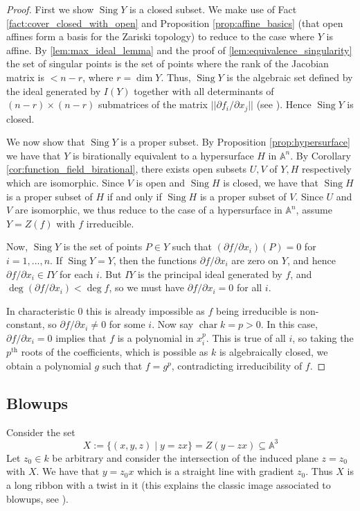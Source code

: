 \documentclass[12pt]{article}
\theoremstyle{plain}
\theoremstyle{definition}
\newcommand{\bb}[1]{\mathbb{#1}}
\begin{document}
\begin{proof}
First we show $\operatorname{Sing}Y$ is a closed subset.  We make use of Fact \ref{fact:cover_closed_with_open} and Proposition \ref{prop:affine_basics} (that open affines form a basis for the Zariski topology) to reduce to the case where $Y$ is affine.  By \ref{lem:max_ideal_lemma} and the proof of \eqref{lem:equivalence_singularity} the set of singular points is the set of points where the rank of the Jacobian matrix is $< n - r$, where $r = \operatorname{dim}Y$. Thus, $\operatorname{Sing}Y$ is the algebraic set defined by the ideal generated by $I(Y)$ together with all determinants of $(n - r) \times (n - r)$ submatrices of the matrix $||\partial f_i/\partial x_j||$ (see \cite{algebra}). Hence $\operatorname{Sing}Y$ is closed.

We now show that $\operatorname{Sing}Y$ is a proper subset. By Proposition \ref{prop:hypersurface} we have that $Y$ is birationally equivalent to a hypersurface $H$ in $\bb{A}^n$. By Corollary \ref{cor:function_field_birational}, there exists open subsets $U,V$ of $Y,H$ respectively which are isomorphic. Since $V$ is open and $\operatorname{Sing}H$ is closed, we have that $\operatorname{Sing}H$ is a proper subset of $H$ if and only if $\operatorname{Sing}H$ is a proper subset of $V$. Since $U$ and $V$ are isomorphic, we thus reduce to the case of a hypersurface in $\bb{A}^n$, assume $Y = Z(f)$ with $f$ irreducible.

Now, $\operatorname{Sing}Y$ is the set of points $P \in Y$ such that $(\partial f/\partial x_i)(P) = 0$ for $i = 1,...,n$. If $\operatorname{Sing}Y = Y$, then the functions $\partial f/\partial x_i$ are zero on $Y$, and hence $\partial f/\partial x_i \in IY$ for each $i$. But $IY$ is the principal ideal generated by $f$, and $\operatorname{deg}(\partial f/\partial x_i) < \operatorname{deg}f$, so we must have $\partial f/\partial x_i = 0$ for all $i$.

In characteristic $0$ this is already impossible as $f$ being irreducible is non-constant, so $\partial f/\partial x_i \neq 0$ for some $i$. Now say $\operatorname{char}k = p > 0$. In this case, $\partial f/\partial x_i = 0$ implies that $f$ is a polynomial in $x_i^p$. This is true of all $i$, so taking the $p^{\text{th}}$ roots of the coefficients, which is possible as $k$ is algebraically closed, we obtain a polynomial $g$ such that $f = g^p$, contradicting irreducibility of $f$.
\end{proof}

\subsection{Blowups}
Consider the set
\[X := \lbrace (x,y,z) \mid y = zx\rbrace = Z(y - zx) \subseteq\bb{A}^3\]
Let $z_0 \in k$ be arbitrary and consider the intersection of the induced plane $z = z_0$ with $X$. We have that $y = z_0x$ which is a straight line with gradient $z_0$. Thus $X$ is a long ribbon with a twist in it (this explains the classic image associated to blowups, see \cite[\S I, 4]{hartshorne}).
\end{document}
